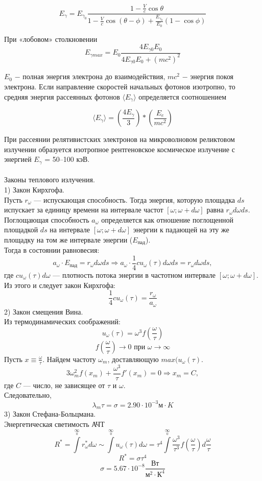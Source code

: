 \documentclass[__main__.tex]{subfiles}
\begin{document}
$$E_γ = E_{γ_0}\frac{1-\frac{V}{c}\cos\theta}{1-\frac{V}{c}\cos(\theta-\phi)+\frac{E_{γ_0}}{E_0}(1-\cos\phi)}$$

При «лобовом» столкновении
$$E_{γmax} = E_0 \frac{4E_{γ0} E_0}{4E_{γ0} E_0 + (mc^2)^2}$$


$E_{0}$ − полная энергия электрона до взаимодействия, $ mc^2$ − энергия покоя электрона.
Если направление скоростей начальных фотонов изотропно, то средняя энергия рассеянных фотонов  $\langle E_γ \rangle$  определяется соотношением

$$\langle E_γ \rangle = (\frac{4E_γ}{3})*(\frac{E_e}{mc^2})$$

При рассеянии релятивистских электронов на микроволновом реликтовом излучении образуется изотропное рентгеновское космическое излучение с энергией 
$E_γ$ = 50–100 кэВ.\\\\
Законы теплового излучения.\\
1) Закон Кирхгофа.\\
Пусть $r_{\omega}$ --- испускающая способность. Тогда энергия, которую площадка $ds$ испускает за единицу времени на интервале частот $[\omega; \omega+d\omega]$ равна $r_\omega d\omega ds$. \\
Поглощающая способность $a_\omega$ определяется как отношение поглощенной площадкой $ds$ на интервале $[\omega;\omega+d\omega]$ энергии к падающей на эту же площадку на том же интервале энергии ($E_{\text{пад}}$).\\
Тогда в состоянии равновесия:
$$
a_\omega \cdot E_{\text{пад}} = r_\omega d\omega ds \Longrightarrow a_\omega\cdot \frac{1}{4}cu_\omega(\tau)d\omega ds = r_\omega d\omega ds,
$$
где $cu_\omega(\tau)d\omega$ --- плотность потока энергии в частотном интервале $[\omega; \omega+d\omega]$.\\
Из этого и следует закон Кирхгофа:
$$
\frac{1}{4}cu_\omega(\tau)=\frac{r_\omega}{a_\omega}
$$
2) Закон смещения Вина. \\
Из термодинамических соображений:
$$
u_\omega(\tau)=\omega^3f\left(\frac{\omega}{\tau}\right)
$$
$$
f\left(\frac{\omega}{\tau}\right)\longrightarrow 0 \text{  при  } \omega \longrightarrow \infty
$$
Пусть $x\equiv \frac{\omega}{\tau}$. Найдем частоту $\omega_m$, доставляющую $max(u_\omega (\tau)$.
$$
3\omega_m^2f(x_m)+\frac{\omega^3}{\tau}f'(x_m)=0 \Longrightarrow x_m=C, 
$$
где $C$ --- число, не зависящее от $\tau$ и $\omega$.\\
Следовательно,
$$
\lambda_m\tau=\sigma=2.90\cdot 10^{-3}\text{м}\cdot K
$$
3) Закон Стефана-Больцмана.\\
Энергетическая светимость АЧТ
$$
R^*=\int\limits^{\infty}\limits_0 r^*_\omega d\omega \sim \int\limits^{\infty}\limits_0 u_\omega(\tau)d\omega =\tau^4 \int\limits^{\infty}\limits_0 \frac{\omega^3}{\tau^3}f\left(\frac{\omega}{\tau}\right)d\frac{\omega}{\tau}
$$
$$
R^*=\sigma \tau^4
$$
$$
\sigma = 5.67\cdot 10^{-8} \frac{\text{Вт}}{\text{м}^2\cdot \text{К}^4}
$$
\end{document}
